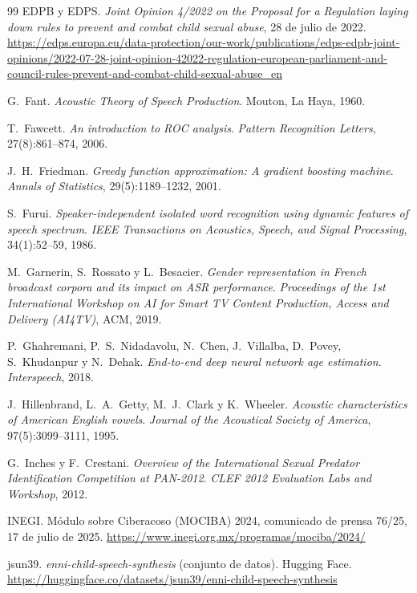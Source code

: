 \documentclass[11pt,a4paper]{article}
\begin{document}
\begin{thebibliography}{99}
 EDPB y EDPS. \emph{Joint Opinion 4/2022 on the Proposal for a Regulation laying down rules to prevent and combat child sexual abuse}, 28 de julio de 2022. \url{https://edps.europa.eu/data-protection/our-work/publications/edps-edpb-joint-opinions/2022-07-28-joint-opinion-42022-regulation-european-parliament-and-council-rules-prevent-and-combat-child-sexual-abuse_en}

 G.~Fant. \emph{Acoustic Theory of Speech Production}. Mouton, La Haya, 1960.

 T.~Fawcett. \emph{An introduction to ROC analysis}. \emph{Pattern Recognition Letters}, 27(8):861--874, 2006.

 J.~H.~Friedman. \emph{Greedy function approximation: A gradient boosting machine}. \emph{Annals of Statistics}, 29(5):1189--1232, 2001.

 S.~Furui. \emph{Speaker-independent isolated word recognition using dynamic features of speech spectrum}. \emph{IEEE Transactions on Acoustics, Speech, and Signal Processing}, 34(1):52--59, 1986.

 M.~Garnerin, S.~Rossato y L.~Besacier. \emph{Gender representation in French broadcast corpora and its impact on ASR performance}. \emph{Proceedings of the 1st International Workshop on AI for Smart TV Content Production, Access and Delivery (AI4TV)}, ACM, 2019.

 P.~Ghahremani, P.~S.~Nidadavolu, N.~Chen, J.~Villalba, D.~Povey, S.~Khudanpur y N.~Dehak. \emph{End-to-end deep neural network age estimation}. \emph{Interspeech}, 2018.

 J.~Hillenbrand, L.~A.~Getty, M.~J.~Clark y K.~Wheeler. \emph{Acoustic characteristics of American English vowels}. \emph{Journal of the Acoustical Society of America}, 97(5):3099--3111, 1995.

 G.~Inches y F.~Crestani. \emph{Overview of the International Sexual Predator Identification Competition at PAN-2012}. \emph{CLEF 2012 Evaluation Labs and Workshop}, 2012.

 INEGI. Módulo sobre Ciberacoso (MOCIBA) 2024, comunicado de prensa 76/25, 17 de julio de 2025. \url{https://www.inegi.org.mx/programas/mociba/2024/}

 jsun39. \emph{enni-child-speech-synthesis} (conjunto de datos). Hugging Face. \url{https://huggingface.co/datasets/jsun39/enni-child-speech-synthesis}


\end{thebibliography}
\end{document}
